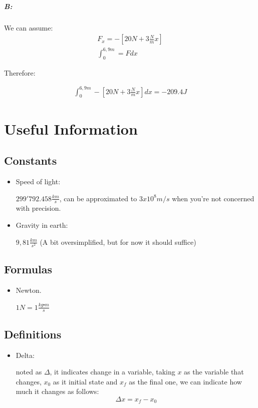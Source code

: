 \documentclass[11pt,fleqn]{book} %
\begin{document}
\paragraph{B:}

We can assume:
\begin{gather}
    F_x = -[20N + 3 \frac{N}{m} x]\\
    \int_0^{6,9m} = F dx
\end{gather}

Therefore:

\begin{gather}
    \int_0^{6,9m} -[20N + 3 \frac{N}{m} x] dx = -209.4 J
\end{gather}

\chapter{Useful Information}

\section{Constants}
\begin{itemize}

    \item Speed of light: 
    
    $299'792.458 \frac{km}{s}$, can be approximated to $ 3x10^8 m/s $ when you're not concerned with precision.

    \item Gravity in earth: 
    
    $ 9,81 \frac{km}{s^2}$ (A bit oversimplified, but for now it should suffice)

\end{itemize}
\section{Formulas}
\begin{itemize}
    \item Newton.
    
    $ 1N = 1 \frac{kg \centerdot m}{s} $
\end{itemize}
\section{Definitions}
\begin{itemize}
    \item Delta: 
    
    noted as $ \Delta $, it indicates change in a variable, taking $ x $ as the variable
    that changes, $ x_0 $ as it initial state and $ x_f $ as the final one, we can indicate how much it
    changes as follows: $$ \Delta x = x_f - x_0 $$
\end{itemize}



\end{document}

